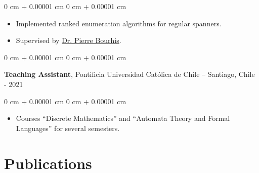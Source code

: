 \documentclass[10pt, letterpaper]{article}
\newenvironment{highlights}{
    \begin{itemize}[
        topsep=0.10 cm,
        parsep=0.10 cm,
        partopsep=0pt,
        itemsep=0pt,
        leftmargin=0 cm + 10pt
    ]
}{
    \end{itemize}
} %
\newenvironment{onecolentry}{
    \begin{adjustwidth}{
        0 cm + 0.00001 cm
    }{
        0 cm + 0.00001 cm
    }
}{
    \end{adjustwidth}
} %
\newenvironment{twocolentry}[2][]{
    \onecolentry
    \def\secondColumn{#2}
    \setcolumnwidth{\fill, 4.5 cm}
    \begin{paracol}{2}
}{
    \switchcolumn \raggedleft \secondColumn
    \end{paracol}
    \endonecolentry
} %
\begin{document}
        \vspace{0.10 cm}
        \begin{onecolentry}
            \begin{highlights}
                \item Implemented ranked enumeration algorithms for regular spanners.
                \item Supervised by \href{https://www.linkedin.com/in/pierre-bourhis-709a1827/?originalSubdomain=fr/}{Dr. Pierre Bourhis}.
            \end{highlights}
        \end{onecolentry}

        \vspace{0.2 cm}

        \begin{twocolentry}{
            2018 - 2021
        }
            \textbf{Teaching Assistant}, Pontificia Universidad Católica de Chile -- Santiago, Chile\end{twocolentry}

        \vspace{0.10 cm}
        \begin{onecolentry}
            \begin{highlights}
                \item Courses ``Discrete Mathematics'' and ``Automata Theory and Formal Languages'' for several semesters.
            \end{highlights}
        \end{onecolentry}
        



    
    \section{Publications}
\end{document}
